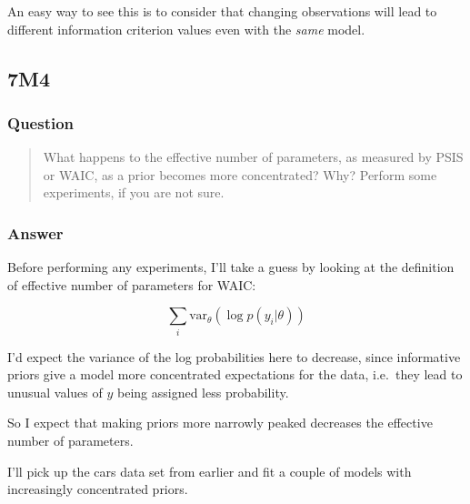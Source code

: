 \documentclass[
]{book}
\begin{document}
An easy way to see this is to consider that changing observations will lead to different information criterion values even with the \emph{same} model.

\hypertarget{m4-3}{%
\subsection*{7M4}\label{m4-3}}

\hypertarget{question-67}{%
\subsubsection*{Question}\label{question-67}}

\begin{quote}
What happens to the effective number of parameters, as measured by PSIS or WAIC, as a prior becomes more concentrated? Why? Perform some experiments, if you are not sure.
\end{quote}

\hypertarget{answer-67}{%
\subsubsection*{Answer}\label{answer-67}}

Before performing any experiments, I'll take a guess by looking at the definition of effective number of parameters for WAIC:

\[ \sum_i \text{var}_\theta ( \log p(y_i | \theta))\]

I'd expect the variance of the log probabilities here to decrease, since informative priors give a model more concentrated expectations for the data, i.e.~they lead to unusual values of \(y\) being assigned less probability.

So I expect that making priors more narrowly peaked decreases the effective number of parameters.

I'll pick up the cars data set from earlier and fit a couple of models with increasingly concentrated priors.
\end{document}
